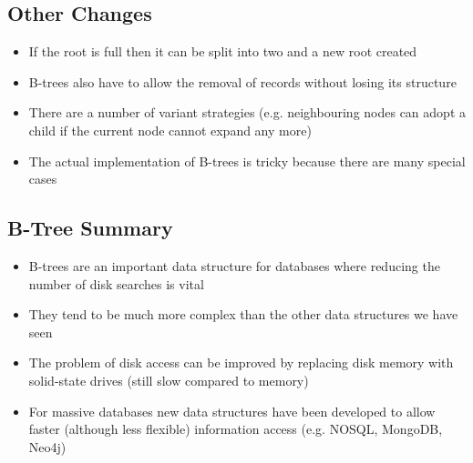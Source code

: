 \begin{slide}
\section{Other Changes}

\begin{PauseHighLight}
  \begin{itemize}
  \item If the root is full then it can be split into two and a new root
    created\pause
  \item B-trees also have to allow the removal of records without losing
    its structure\pause
  \item There are a number of variant strategies (e.g. neighbouring
    nodes can adopt a child if the current node cannot expand any more)\pause
  \item The actual implementation of B-trees is tricky because there are
    many special cases\pause
  \end{itemize}
\end{PauseHighLight}

\end{slide}


\begin{slide}
\section{B-Tree Summary}

\begin{PauseHighLight}
  \begin{itemize}
  \item B-trees are an important data structure for databases where
    reducing the number of disk searches is vital\pause
  \item They tend to be much more complex than the other data structures
    we have seen\pause
  \item The problem of disk access can be improved by replacing disk
    memory with solid-state drives (still slow compared to memory)\pause
  \item For massive databases new data structures have been developed to
    allow faster (although less flexible) information access
    (e.g. NOSQL, MongoDB, Neo4j)\pause
  \end{itemize}
\end{PauseHighLight}
\end{slide}



